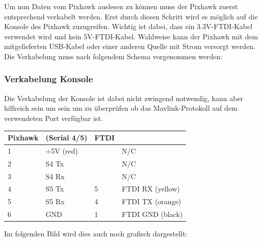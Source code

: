 \documentclass[12pt]{article} %
\begin{document}
	Um nun Daten vom Pixhawk auslesen zu können muss der Pixhawk zuerst entsprechend verkabelt werden. Erst durch diesen Schritt wird es möglich auf die Konsole des Pixhawk zuzugreifen. Wichtig ist dabei, dass ein 3.3V-FTDI-Kabel verwendet wird und kein 5V-FTDI-Kabel. Wahlweise kann der Pixhawk mit dem mitgelieferten USB-Kabel oder einer anderen Quelle mit Strom versorgt werden. Die Verkabelung muss nach folgendem Schema vorgenommen werden:
	
	\subsubsection{Verkabelung Konsole}
	
	Die Verkabelung der Konsole ist dabei nicht zwingend notwendig, kann aber hilfreich sein um sein um zu überprüfen ob das Mavlink-Protokoll auf dem verwendeten Port verfügbar ist. 
	\begin{description}
		\item
		\begin{tabular}{p{2cm}p{4cm}p{2cm}p{4cm}}
			\centering 
			\textbf{ Pixhawk} & \textbf{(Serial 4/5)} & \textbf{FTDI}& \\ \hline
			1 & +5V (red)	& 		& N/C				\\ \hline
			2 & S4 Tx	 	&		& N/C				\\ \hline
			3 & S4 Rx		&		& N/C				\\ \hline
			4 & S5 Tx		& 5		& FTDI RX (yellow)	\\ \hline
			5 & S5 Rx		& 4		& FTDI TX (orange)	\\ \hline
			6 & GND			& 1		& FTDI GND (black)	\\ \hline
			
		\end{tabular}
	\end{description}

	Im folgenden Bild wird dies auch noch grafisch dargestellt:
\end{document}
